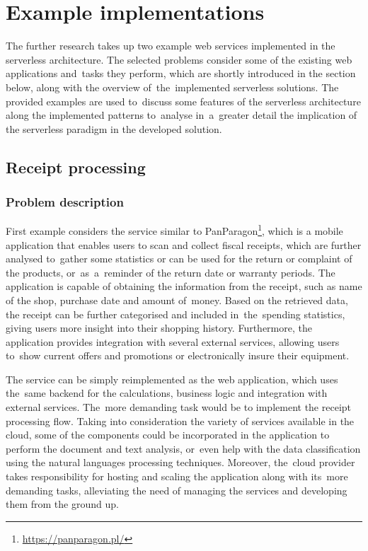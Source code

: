 \newpage

\section{Example implementations} \label{chapter:example-implementations}

The further research takes up two example web services implemented in the serverless architecture.
The selected problems consider some of the existing web applications and~tasks they perform, which are shortly introduced in the section below, along with the overview of~the~implemented serverless solutions.
The provided examples are used to~discuss some features of the serverless architecture along the implemented patterns to~analyse in~a~greater detail the implication of the serverless paradigm in the developed solution.

\subsection{Receipt processing} \label{chapter:examples-receipt-processing}

\subsubsection{Problem description}

First example considers the service similar to PanParagon\footnote{\url{https://panparagon.pl/}}, which is a mobile application that enables users to scan and collect fiscal receipts, which are further analysed to~gather some statistics or can be used for the return or complaint of the products, or~as~a~reminder of the return date or warranty periods.
The application is capable of obtaining the information from the receipt, such as name of the shop, purchase date and amount of~money. Based on the retrieved data, the receipt can be further categorised and included in~the~spending statistics, giving users more insight into their shopping history. Furthermore, the application provides integration with several external services, allowing users to~show current offers and promotions or electronically insure their equipment.

The service can be simply reimplemented as the web application, which uses the~same backend for the calculations, business logic and integration with external services. The~more demanding task would be to implement the receipt processing flow. Taking into consideration the variety of services available in the cloud, some of the components could be incorporated in the application to perform the document and text analysis, or~even help with the data classification using the natural languages processing techniques. Moreover, the~cloud provider takes responsibility for hosting and scaling the application along with its~more demanding tasks, alleviating the need of managing the services and developing them from the ground up.

